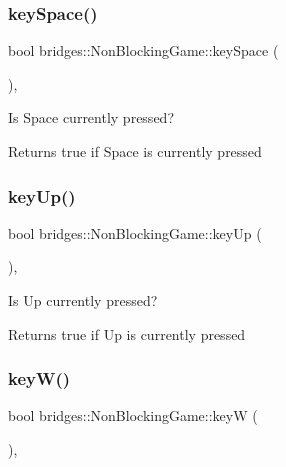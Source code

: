 \subsubsection{\texorpdfstring{key\+Space()}{keySpace()}}
{\footnotesize\ttfamily bool bridges\+::\+Non\+Blocking\+Game\+::key\+Space (\begin{DoxyParamCaption}{ }\end{DoxyParamCaption})\hspace{0.3cm}{\ttfamily [inline]}, {\ttfamily [protected]}}



Is Space currently pressed? 

\begin{DoxyReturn}{Returns}
true if Space is currently pressed 
\end{DoxyReturn}
\mbox{\label{classbridges_1_1_non_blocking_game_ad86357fce301559a5e29691045ea243e}} 
\subsubsection{\texorpdfstring{key\+Up()}{keyUp()}}
{\footnotesize\ttfamily bool bridges\+::\+Non\+Blocking\+Game\+::key\+Up (\begin{DoxyParamCaption}{ }\end{DoxyParamCaption})\hspace{0.3cm}{\ttfamily [inline]}, {\ttfamily [protected]}}



Is Up currently pressed? 

\begin{DoxyReturn}{Returns}
true if Up is currently pressed 
\end{DoxyReturn}
\mbox{\label{classbridges_1_1_non_blocking_game_a4d5b1c1634e450eb502e8690659e500d}} 
\subsubsection{\texorpdfstring{key\+W()}{keyW()}}
{\footnotesize\ttfamily bool bridges\+::\+Non\+Blocking\+Game\+::keyW (\begin{DoxyParamCaption}{ }\end{DoxyParamCaption})\hspace{0.3cm}{\ttfamily [inline]}, {\ttfamily [protected]}}



